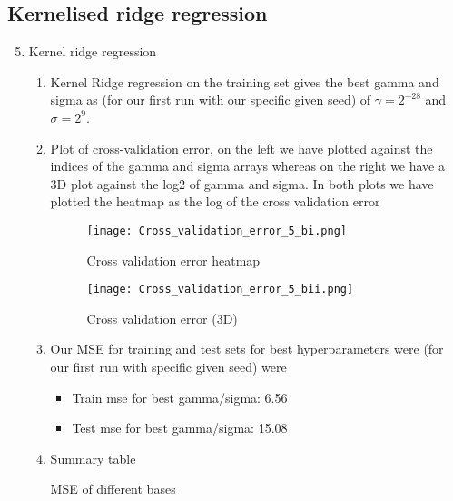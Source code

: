 \documentclass{article}
\begin{document}
\subsection{Kernelised ridge regression}
    \begin{enumerate}
        \setcounter{enumi}{4}
        \item Kernel ridge regression
        \begin{enumerate}
            \item Kernel Ridge regression on the training set gives the best gamma and sigma as (for our first run with our specific given seed) of $\gamma=2^{-28}$ and $\sigma=2^{9}$.
            \item Plot of cross-validation error, on the left we have plotted against the indices of the gamma and sigma arrays whereas on the right we have a 3D plot against the log2 of gamma and sigma. In both plots we have plotted the heatmap as the log of the cross validation error
                \begin{figure}[H]
                  \centering
                  \begin{minipage}[b]{0.45\textwidth}
                    \texttt{[image: Cross\_validation\_error\_5\_bi.png]}
                    \caption{\label{fig:Cross_validation_error_5_bi}Cross validation error heatmap}
                  \end{minipage}
                  \begin{minipage}[b]{0.45\textwidth}
                    \texttt{[image: Cross\_validation\_error\_5\_bii.png]}
                    \caption{\label{fig:Cross_validation_error_5_bii}Cross validation error (3D)}
                  \end{minipage}
                \end{figure}
            \item Our MSE for training and test sets for best hyperparameters were (for our first run with specific given seed) were
            \begin{itemize}
                \item Train mse for best gamma/sigma: 6.56
                \item Test mse for best gamma/sigma: 15.08
            \end{itemize}
            \item Summary table
            \begin{table}[H]
                \centering
                
                \caption{MSE of different bases}
                \label{fig:summarytable}
            \end{table}

        \end{enumerate}
    \end{enumerate}
\end{document}
